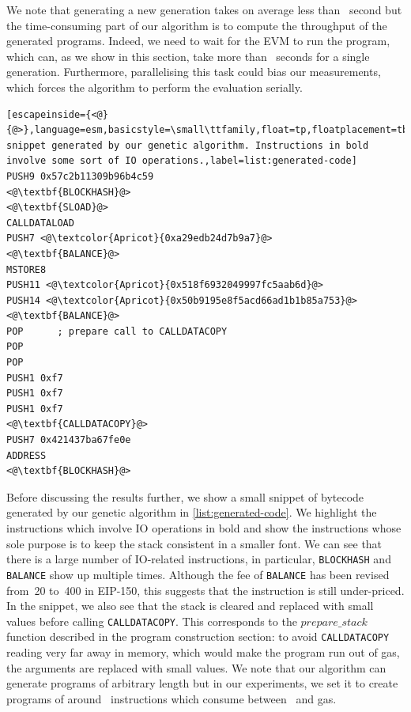   We note that generating a new generation takes on average less than~ second but the time-consuming part of our algorithm is to compute the throughput of the generated programs. Indeed, we need to wait for the EVM to run the program, which can, as we show in this section, take more than~ seconds for a single generation. Furthermore, parallelising this task could bias our measurements, which forces the algorithm to perform the evaluation serially.

  \begin{lstlisting}[escapeinside={<@}{@>},language=esm,basicstyle=\small\ttfamily,float=tp,floatplacement=tbp,caption=Bytecode snippet generated by our genetic algorithm. Instructions in bold involve some sort of IO operations.,label=list:generated-code]
PUSH9 0x57c2b11309b96b4c59
<@\textbf{BLOCKHASH}@>
<@\textbf{SLOAD}@>
CALLDATALOAD
PUSH7 <@\textcolor{Apricot}{0xa29edb24d7b9a7}@>
<@\textbf{BALANCE}@>
MSTORE8
PUSH11 <@\textcolor{Apricot}{0x518f6932049997fc5aab6d}@>
PUSH14 <@\textcolor{Apricot}{0x50b9195e8f5acd66ad1b1b85a753}@>
<@\textbf{BALANCE}@>
POP      ; prepare call to CALLDATACOPY
POP
POP
PUSH1 0xf7
PUSH1 0xf7
PUSH1 0xf7
<@\textbf{CALLDATACOPY}@>
PUSH7 0x421437ba67fe0e
ADDRESS
<@\textbf{BLOCKHASH}@>
\end{lstlisting}

  Before discussing the results further, we show a small snippet of bytecode generated by our genetic algorithm in \autoref{list:generated-code}. We highlight the instructions which involve IO operations in bold and show the instructions whose sole purpose is to keep the stack consistent in a smaller font. We can see that there is a large number of IO-related instructions, in particular, \lstinline{BLOCKHASH} and \lstinline{BALANCE} show up multiple times. Although the fee of \lstinline{BALANCE} has been revised from~20 to~400 in EIP-150, this suggests that the instruction is still under-priced. In the snippet, we also see that the stack is cleared and replaced with small values before calling \lstinline{CALLDATACOPY}. This corresponds to the $prepare\_stack$ function described in the program construction section: to avoid \lstinline{CALLDATACOPY} reading very far away in memory, which would make the program run out of gas, the arguments are replaced with small values. We note that our algorithm can generate programs of arbitrary length but in our experiments, we set it to create programs of around~ instructions which consume between~ and  gas.

